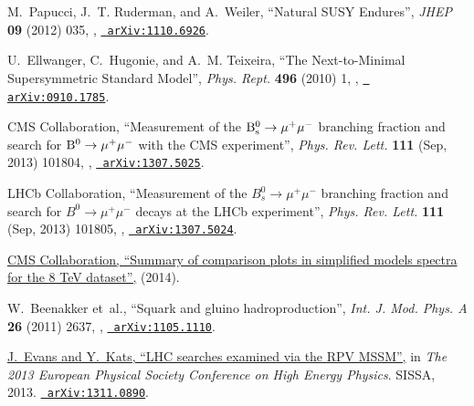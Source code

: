 \documentclass[12pt]{thesis}  %
\begin{document}
\begin{thebibliography}{100}
\hrefCMSnoop {} {M.~Papucci, J.~T. Ruderman, and A.~Weiler, ``{Natural SUSY
  Endures}'',} \textit{ JHEP} \textbf{ 09} (2012) 035,
  \href{http://dx.doi.org/10.1007/JHEP09(2012)035}{},
\href{http://www.arXiv.org/abs/1110.6926}{\texttt{ arXiv:1110.6926}}.

\hrefCMSnoop {} {U.~Ellwanger, C.~Hugonie, and A.~M. Teixeira, ``The
  Next-to-Minimal Supersymmetric Standard Model'',} \textit{ Phys. Rept.}
  \textbf{ 496} (2010) 1,
  \href{http://dx.doi.org/10.1016/j.physrep.2010.07.001}{},
  \href{http://www.arXiv.org/abs/0910.1785}{\texttt{ arXiv:0910.1785}}.

\hrefCMSnoop {} {{ CMS} Collaboration, ``Measurement of the $\mathrm{B}^{0}_{\mathrm{s}}
  \rightarrow \mu^{+} \mu^{-}$ branching fraction and search for $\mathrm{B}^{0}
  \rightarrow \mu^{+} \mu^{-}$ with the CMS experiment'',} \textit{ Phys. Rev.
  Lett.} \textbf{ 111} (Sep, 2013) 101804,
  \href{http://dx.doi.org/10.1103/PhysRevLett.111.101804}{},
  \href{http://www.arXiv.org/abs/1307.5025}{\texttt{ arXiv:1307.5025}}.

\hrefCMSnoop {} {{ LHCb} Collaboration, ``Measurement of the $B^{0}_{s}
  \rightarrow \mu^{+} \mu^{-}$ branching fraction and search for $B^{0}
  \rightarrow \mu^{+} \mu^{-}$ decays at the LHCb experiment'',} \textit{ Phys.
  Rev. Lett.} \textbf{ 111} (Sep, 2013) 101805,
  \href{http://dx.doi.org/10.1103/PhysRevLett.111.101805}{},
  \href{http://www.arXiv.org/abs/1307.5024}{\texttt{ arXiv:1307.5024}}.

\href {https://twiki.cern.ch/twiki/bin/view/CMSPublic/SUSYSMSSummaryPlots8TeV}
  {{ CMS} Collaboration, ``Summary of comparison plots in simplified models
  spectra for the 8 TeV dataset'',} (2014).

W.~Beenakker\hrefCMSnoop {} { {et~al.}, ``{Squark and gluino
  hadroproduction}'',} \textit{ Int. J. Mod. Phys. A} \textbf{ 26} (2011) 2637,
  \href{http://dx.doi.org/10.1142/S0217751X11053560}{},
  \href{http://www.arXiv.org/abs/1105.1110}{\texttt{ arXiv:1105.1110}}.

\href {http://pos.sissa.it/archive/conferences/180/287/EPS-HEP 2013_287.pdf}
  {J.~Evans and Y.~Kats, ``{LHC searches examined via the RPV MSSM}'',} in
  \textit{ The 2013 European Physical Society Conference on High Energy
  Physics}.
\newblock SISSA, 2013.
\newblock \href{http://www.arXiv.org/abs/1311.0890}{\texttt{ arXiv:1311.0890}}.


\end{thebibliography}
\end{document}
